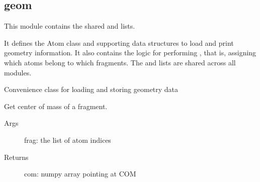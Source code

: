 \documentclass[letterpaper,10pt,english]{sphinxmanual}
\begin{document}
\subsection{geom}
\label{\detokenize{globals:module-Globals.geom}}\label{\detokenize{globals:geom}}
This module contains the shared  and  lists.

It defines the Atom class and supporting data structures to load and print
geometry information. It also contains the logic for performing ,
that is, assigning which atoms belong to which fragments. The 
and  lists are shared across all modules.

\begin{fulllineitems}
\label{\detokenize{globals:Globals.geom.Atom}}
Convenience class for loading and storing geometry data

\end{fulllineitems}


\begin{fulllineitems}
\label{\detokenize{globals:Globals.geom.com}}
Get center of mass of a fragment.
\begin{description}
\item[{Args}] \leavevmode
frag: the list of atom indices

\item[{Returns}] \leavevmode
com: numpy array pointing at COM

\end{description}

\end{fulllineitems}

\end{document}
